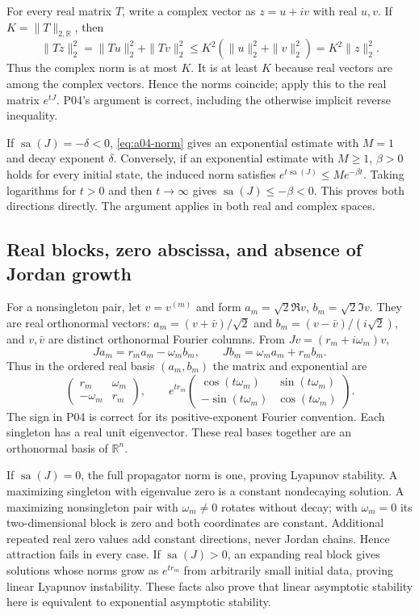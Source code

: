 \documentclass[11pt]{article}
\newcommand{\RR}{\mathbb R}
\newcommand{\sa}{\operatorname{sa}}
\begin{document}
For every real matrix $T$, write a complex vector as $z=u+iv$ with real
$u,v$. If $K=\|T\|_{2,\RR}$, then
\[
 \|Tz\|_2^2=\|Tu\|_2^2+\|Tv\|_2^2
 \le K^2(\|u\|_2^2+\|v\|_2^2)=K^2\|z\|_2^2.
\]
Thus the complex norm is at most $K$. It is at least $K$ because real
vectors are among the complex vectors. Hence the norms coincide; apply
this to the real matrix $e^{tJ}$. P04's argument is correct, including
the otherwise implicit reverse inequality.

If $\sa(J)=-\delta<0$, \eqref{eq:a04-norm} gives an exponential estimate
with $M=1$ and decay exponent $\delta$. Conversely, if an exponential
estimate with $M\ge1$, $\beta>0$ holds for every initial state, the induced
norm satisfies $e^{t\sa(J)}\le Me^{-\beta t}$. Taking logarithms for $t>0$
and then $t\to\infty$ gives $\sa(J)\le-\beta<0$. This proves both
directions directly. The argument applies in both real and complex spaces.

\subsection{Real blocks, zero abscissa, and absence of Jordan growth}
For a nonsingleton pair, let $v=v^{(m)}$ and form
$a_m=\sqrt2\Re v$, $b_m=\sqrt2\Im v$. They are real orthonormal vectors:
$a_m=(v+\bar v)/\sqrt2$ and $b_m=(v-\bar v)/(i\sqrt2)$, and $v,\bar v$
are distinct orthonormal Fourier columns. From $Jv=(r_m+i\omega_m)v$,
\[
 Ja_m=r_ma_m-\omega_mb_m,\qquad
 Jb_m=\omega_ma_m+r_mb_m.
\]
Thus in the ordered real basis $(a_m,b_m)$ the matrix and exponential are
\[
 \begin{pmatrix}r_m&\omega_m\\-\omega_m&r_m\end{pmatrix},\qquad
 e^{tr_m}\begin{pmatrix}\cos(t\omega_m)&\sin(t\omega_m)\\
                  -\sin(t\omega_m)&\cos(t\omega_m)\end{pmatrix}.
\]
The sign in P04 is correct for its positive-exponent Fourier convention.
Each singleton has a real unit eigenvector. These real bases together are
an orthonormal basis of $\RR^n$.

If $\sa(J)=0$, the full propagator norm is one, proving Lyapunov stability.
A maximizing singleton with eigenvalue zero is a constant nondecaying
solution. A maximizing nonsingleton pair with $\omega_m\ne0$ rotates
without decay; with $\omega_m=0$ its two-dimensional block is zero and
both coordinates are constant. Additional repeated real zero values add
constant directions, never Jordan chains. Hence attraction fails in every
case. If $\sa(J)>0$, an expanding real block gives solutions whose norms
grow as $e^{tr_m}$ from arbitrarily small initial data, proving linear
Lyapunov instability. These facts also prove that linear asymptotic
stability here is equivalent to exponential asymptotic stability.
\end{document}
